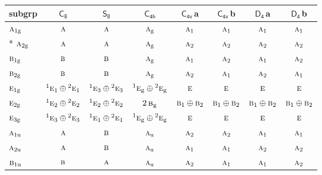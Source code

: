 \documentclass[10pt,a4paper]{article}
\numberwithin{equation}{section}
\newcommand{\grp}[1]{\mathsf{#1}}
\newcommand{\irr}[1]{\text{\normalfont\scshape #1}}
\newcommand{\conjpair}[1]{{}^{#1}}
\newcommand{\ptag}[1]{\mathrm{#1}}
\newcommand{\clsletter}[1]{\,{\scriptsize\color{black!55}#1}}
\begin{document}
{\small\begin{longtable}{@{}lccccccc@{}}\toprule
subgrp & \href{C8.pdf}{$\grp{C_{8}}$} & \href{S8.pdf}{$\grp{S_{8}}$} & \href{C4h.pdf}{$\grp{C_{4h}}$} & \href{C4v.pdf}{$\grp{C_{4v}}$}\clsletter{a} & \href{C4v.pdf}{$\grp{C_{4v}}$}\clsletter{b} & \href{D4.pdf}{$\grp{D_{4}}$}\clsletter{a} & \href{D4.pdf}{$\grp{D_{4}}$}\clsletter{b}\\\midrule\endhead
\bottomrule\endfoot\endlastfoot
$\irr{a}_{1\ptag{g}}$ & $\irr{a}$ & $\irr{a}$ & $\irr{a}_{\ptag{g}}$ & $\irr{a}_{1}$ & $\irr{a}_{1}$ & $\irr{a}_{1}$ & $\irr{a}_{1}$\\*
$\irr{a}_{2\ptag{g}}$ & $\irr{a}$ & $\irr{a}$ & $\irr{a}_{\ptag{g}}$ & $\irr{a}_{2}$ & $\irr{a}_{2}$ & $\irr{a}_{2}$ & $\irr{a}_{2}$\\
$\irr{b}_{1\ptag{g}}$ & $\irr{b}$ & $\irr{b}$ & $\irr{a}_{\ptag{g}}$ & $\irr{a}_{1}$ & $\irr{a}_{2}$ & $\irr{a}_{1}$ & $\irr{a}_{2}$\\
$\irr{b}_{2\ptag{g}}$ & $\irr{b}$ & $\irr{b}$ & $\irr{a}_{\ptag{g}}$ & $\irr{a}_{2}$ & $\irr{a}_{1}$ & $\irr{a}_{2}$ & $\irr{a}_{1}$\\
$\irr{e}_{1\ptag{g}}$ & $\conjpair{1}\irr{e}_{1}\oplus \conjpair{2}\irr{e}_{1}$ & $\conjpair{1}\irr{e}_{3}\oplus \conjpair{2}\irr{e}_{3}$ & $\conjpair{1}\irr{e}_{\ptag{g}}\oplus \conjpair{2}\irr{e}_{\ptag{g}}$ & $\irr{e}$ & $\irr{e}$ & $\irr{e}$ & $\irr{e}$\\
$\irr{e}_{2\ptag{g}}$ & $\conjpair{1}\irr{e}_{2}\oplus \conjpair{2}\irr{e}_{2}$ & $\conjpair{1}\irr{e}_{2}\oplus \conjpair{2}\irr{e}_{2}$ & $2\,\irr{b}_{\ptag{g}}$ & $\irr{b}_{1}\oplus \irr{b}_{2}$ & $\irr{b}_{1}\oplus \irr{b}_{2}$ & $\irr{b}_{1}\oplus \irr{b}_{2}$ & $\irr{b}_{1}\oplus \irr{b}_{2}$\\
$\irr{e}_{3\ptag{g}}$ & $\conjpair{1}\irr{e}_{3}\oplus \conjpair{2}\irr{e}_{3}$ & $\conjpair{1}\irr{e}_{1}\oplus \conjpair{2}\irr{e}_{1}$ & $\conjpair{1}\irr{e}_{\ptag{g}}\oplus \conjpair{2}\irr{e}_{\ptag{g}}$ & $\irr{e}$ & $\irr{e}$ & $\irr{e}$ & $\irr{e}$\\
$\irr{a}_{1\ptag{u}}$ & $\irr{a}$ & $\irr{b}$ & $\irr{a}_{\ptag{u}}$ & $\irr{a}_{2}$ & $\irr{a}_{2}$ & $\irr{a}_{1}$ & $\irr{a}_{1}$\\
$\irr{a}_{2\ptag{u}}$ & $\irr{a}$ & $\irr{b}$ & $\irr{a}_{\ptag{u}}$ & $\irr{a}_{1}$ & $\irr{a}_{1}$ & $\irr{a}_{2}$ & $\irr{a}_{2}$\\
$\irr{b}_{1\ptag{u}}$ & $\irr{b}$ & $\irr{a}$ & $\irr{a}_{\ptag{u}}$ & $\irr{a}_{2}$ & $\irr{a}_{1}$ & $\irr{a}_{1}$ & $\irr{a}_{2}$\\

\end{longtable}}
\end{document}
